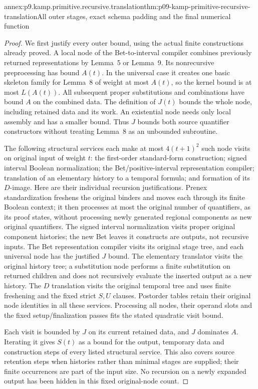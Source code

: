 \begin{annexitem}{annex:p9.kamp.primitive.recursive.translation}{thm:p09-kamp-primitive-recursive-translation}{All outer stages, exact schema padding and the final numerical function}
\begin{proof}
We first justify every outer bound, using the actual finite
constructions already proved. A local node of the Bet-to-interval
compiler combines previously returned representations by Lemma~5
or Lemma~9. Its nonrecursive preprocessing has bound \(A(t)\).
In the universal case it creates one basic skeleton family for
Lemma~8 of weight at most \(A(t)\), so the kernel bound
is at most \(L(A(t))\). All subsequent proper substitutions
and combinations have bound \(A\) on the combined data.
The definition of \(J(t)\) bounds the whole node, including
retained data and its work. An existential node needs only local
assembly and has a smaller bound. Thus \(J\) bounds both
source quantifier constructors without treating Lemma~8 as an
unbounded subroutine.

The following structural services each make at most
\(4(t+1)^2\) such node visits on original input of weight
\(t\): the first-order standard-form construction; signed
interval Boolean normalization; the Bet/positive-interval representation
compiler; translation of an elementary history to a temporal formula;
and formation of its \(D\)-image. Here are their individual
recursion justifications. Prenex standardization freshens the original
binders and moves each through its finite Boolean context; it then
processes at most the original number of quantifiers, as its proof
states, without processing newly generated regional components as
new original quantifiers. The signed interval normalization visits
proper original component histories; the new Bet leaves it constructs
are outputs, not recursive inputs. The Bet representation compiler
visits its original stage tree, and each universal node has the
justified \(J\) bound. The elementary translator visits the
original history tree; a substitution node performs a finite
substitution on returned children and does not recursively evaluate
the inserted output as a new history. The \(D\) translation
visits the original temporal tree and uses finite freshening and
the fixed strict \(S,U\) clauses. Postorder tables retain
their original node identities in all these services. Processing
all nodes, their operand slots and the fixed setup/finalization
passes fits the stated quadratic visit bound.

Each visit is bounded by \(J\) on its current retained data,
and \(J\) dominates \(A\). Iterating it gives \(S(t)\)
as a bound for the output, temporary data and construction steps
of every listed structural service. This also covers source
retention steps when histories rather than minimal stages are
supplied; their finite occurrences are part of the input size.
No recursion on a newly expanded output has been hidden in this
fixed original-node count.


\end{proof}
\end{annexitem}
